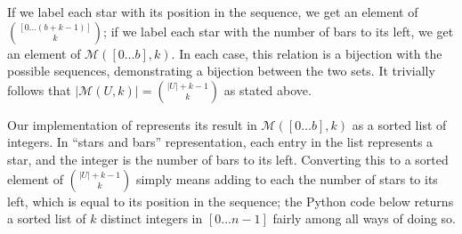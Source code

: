 \documentclass[letterpaper,luatex,11pt]{article}
\begin{document}
If we label each star with its position in the sequence, we get an element of
$\binom{[0 \ldots (b + k -1)]}{k}$;
if we label each star with the number of bars to its left, we get an element of
$\mathcal{M}([0 \ldots b], k)$. In each case, this relation is a bijection with the possible
sequences, demonstrating a bijection between the two sets. It trivially follows that
$|\mathcal{M}(U, k)| = \binom{|U| + k - 1}{k}$ as stated above.

Our implementation of 
represents its result in $\mathcal{M}([0 \ldots b], k)$ as a sorted list of integers.
In ``stars and bars'' representation,
each entry in the list represents a star, and the integer is the number of bars to its left.
Converting this to a sorted element of $\binom{|U| + k - 1}{k}$ simply means adding to each
the number of stars to its left, which is equal to its position in the sequence; the Python code
below returns a sorted list of $k$ distinct integers in $[0 \ldots n-1]$ fairly among all ways
of doing so.

\inputminted{Python}{choose_binom.py}

\printbibliography
\end{document}
